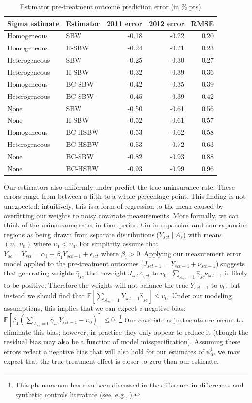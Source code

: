 \documentclass[aoas]{imsart}
\theoremstyle{plain}
\theoremstyle{remark}
\begin{document}
\begin{table}[ht]
\caption{Estimator
pre-treatment outcome prediction error (in \% pts)}\label{tab:pretxpred}
\begin{tabular}{llrrr}
  \hline
Sigma estimate & Estimator & 2011 error & 2012 error & RMSE \\ 
  \hline
Homogeneous & SBW & -0.18 & -0.22 & 0.20 \\ 
  Homogeneous & H-SBW & -0.24 & -0.21 & 0.23 \\ 
  Heterogeneous & SBW & -0.25 & -0.30 & 0.27 \\ 
  Heterogeneous & H-SBW & -0.32 & -0.39 & 0.36 \\ 
  Homogeneous & BC-SBW & -0.42 & -0.35 & 0.39 \\ 
  Heterogeneous & BC-SBW & -0.45 & -0.39 & 0.42 \\ 
  None & SBW & -0.50 & -0.61 & 0.56 \\ 
  None & H-SBW & -0.52 & -0.61 & 0.57 \\ 
  Homogeneous & BC-HSBW & -0.53 & -0.62 & 0.58 \\ 
  Heterogeneous & BC-HSBW & -0.53 & -0.72 & 0.63 \\ 
  None & BC-SBW & -0.82 & -0.93 & 0.88 \\ 
  None & BC-HSBW & -0.93 & -0.99 & 0.96 \\ 
   \hline
\end{tabular}
\end{table}

Our estimators also uniformly under-predict the true uninsurance rate. These errors range from between a fifth to a whole percentage point. This finding is not unexpected: intuitively, this is a form of regression-to-the-mean caused by overfitting our weights to noisy covariate measurements. More formally, we can think of the uninsurance rates in time period $t$ in in expansion and non-expansion regions as being drawn from separate distributions ($Y_{sct} \mid A_s$) with means $(\upsilon_1, \upsilon_0)$ where $\upsilon_1 < \upsilon_0$. For simplicity assume that $Y_{sc} = Y_{sct} = \alpha_1 + \beta_1Y_{sct-1} + \epsilon_{sct}$ where $\beta_1 > 0$. Applying our measurement error model applied to the pre-treatment outcomes ($J_{sct-1} = Y_{sct-1} + \nu_{sct-1}$) suggests that generating weights $\hat{\gamma}_{sc}$ that reweight $J_{sct}A_{sct}$ to $\upsilon_0$, $\sum_{A_{sc} = 1}\hat{\gamma}_{sc}\nu_{sct-1}$ is likely to be positive. Therefore the weights will not balance the true $Y_{sct-1}$ to $\upsilon_0$, but instead we should find that $\mathbb{E}[\sum_{A_{sc} = 1}Y_{sct-1}\hat{\gamma}_{sc}] \le \upsilon_0$. Under our modeling assumptions, this implies that we can expect a negative bias: $\mathbb{E}[\beta_1(\sum_{A_{sc} = 1}\hat{\gamma}_{sc}Y_{sct-1} - \upsilon_0)] \le 0$. \footnote{This phenomenon has also been discussed in the difference-in-differences and synthetic controls literature (see, e.g., \cite{daw2018matching}).} 
Our covariate adjustments are meant to eliminate this bias; however, in practice they only appear to reduce it (though the residual bias may also be a function of model misspecification). Assuming these errors reflect a negative bias that will also hold for our estimates of $\psi^1_0$, we may expect that the true treatment effect is closer to zero than our estimate. 
\end{document}
